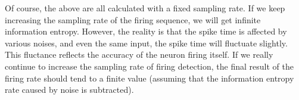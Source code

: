 Of course, the above are all calculated with a fixed sampling rate. If
we keep increasing the sampling rate of the firing sequence, we will
get infinite information entropy. However, the reality is that the
spike time is affected by various noises, and even the same input, the
spike time  will fluctuate slightly. This fluctance reflects the accuracy of the neuron firing itself. If we really continue to increase the sampling rate of firing detection, the final result of the firing rate should tend to a finite value (assuming that the information entropy rate caused by noise is subtracted).



